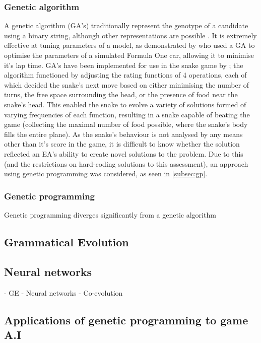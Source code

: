 \documentclass[british,10pt,a4paper]{article}
\begin{document}
\subsubsection{Genetic algorithm}
A genetic algorithm (GA's) traditionally represent the genotype of a candidate using a binary string, although other representations are possible \cite{Whitley1994-tx}. It is extremely effective at tuning parameters of a model, as demonstrated by \citet{Wloch2004-vo} who used a GA to optimise the parameters of a simulated Formula One car, allowing it to minimise it's lap time. GA's have been implemented for use in the snake game by \citet{Yeh2016-ts}; the algorithm functioned by adjusting the rating functions of 4 operations, each of which decided the snake's next move based on either minimising the number of turns, the free space surrounding the head, or the presence of food near the snake's head. This enabled the snake to evolve a variety of solutions formed of varying frequencies of each function, resulting in a snake capable of beating the game (collecting the maximal number of food possible, where the snake's body fills the entire plane). As the snake's behaviour is not analysed by any means other than it's score in the game, it is difficult to know whether the solution reflected an EA's ability to create novel solutions to the problem. Due to this (and the restrictions on hard-coding solutions to this assessment), an approach using genetic programming was considered, as seen in \autoref{subsec:gp}.

\subsubsection{Genetic programming}
\label{subsec:gp}
Genetic programming diverges significantly from a genetic algorithm 

\subsection{Grammatical Evolution}
\subsection{Neural networks}
- GE
- Neural networks
- Co-evolution

\subsection{Applications of genetic programming to game A.I}
\end{document}
